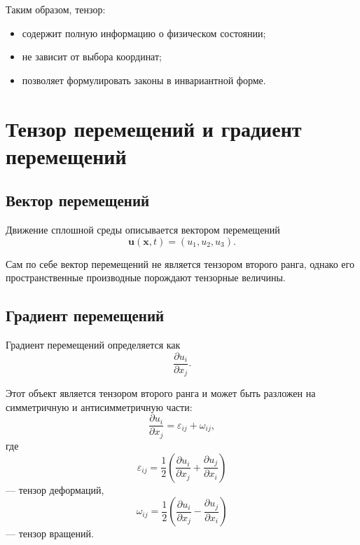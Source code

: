 Таким образом, тензор:
\begin{itemize}
\item содержит полную информацию о физическом состоянии;
\item не зависит от выбора координат;
\item позволяет формулировать законы в инвариантной форме.
\end{itemize}

\section{Тензор перемещений и градиент перемещений}

\subsection{Вектор перемещений}

Движение сплошной среды описывается
вектором перемещений
\begin{equation}
\mathbf{u}(\mathbf{x},t) = (u_1, u_2, u_3).
\end{equation}

Сам по себе вектор перемещений
не является тензором второго ранга,
однако его пространственные производные
порождают тензорные величины.

\subsection{Градиент перемещений}

Градиент перемещений определяется как
\begin{equation}
\frac{\partial u_i}{\partial x_j}.
\end{equation}

Этот объект является тензором второго ранга
и может быть разложен на симметричную и антисимметричную части:
\begin{equation}
\frac{\partial u_i}{\partial x_j}
=
\varepsilon_{ij}
+
\omega_{ij},
\end{equation}
где
\begin{equation}
\varepsilon_{ij}
=
\frac{1}{2}
\left(
\frac{\partial u_i}{\partial x_j}
+
\frac{\partial u_j}{\partial x_i}
\right)
\end{equation}
— тензор деформаций,
\begin{equation}
\omega_{ij}
=
\frac{1}{2}
\left(
\frac{\partial u_i}{\partial x_j}
-
\frac{\partial u_j}{\partial x_i}
\right)
\end{equation}
— тензор вращений.

